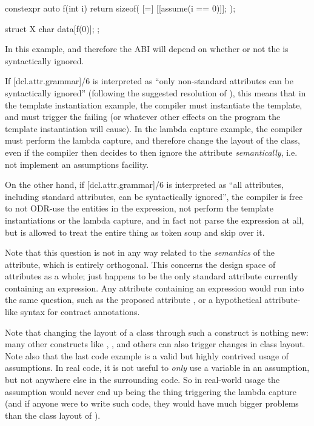\begin{codeblock}
constexpr auto f(int i) {
  return sizeof( [=] { [[assume(i == 0)]]; } );
}

struct X {
  char data[f(0)];
};
\end{codeblock}

In this example,  and therefore the ABI will depend on whether or not the  is syntactically ignored.

If [dcl.attr.grammar]/6 is interpreted as ``only non-standard attributes can be syntactically ignored'' (following the suggested resolution of \cite{CWG2538}), this means that in the template instantiation example, the compiler must instantiate the template, and must trigger the failing  (or whatever other effects on the program the template instantiation will cause). In the lambda capture example, the compiler must perform the lambda capture, and therefore change the layout of the class, even if the compiler then decides to then ignore the attribute \emph{semantically}, i.e. not implement an assumptions facility.

On the other hand, if [dcl.attr.grammar]/6 is interpreted as ``all attributes, including standard attributes, can be syntactically ignored'', the compiler is free to not ODR-use the entities in the expression, not perform the template instantiations or the lambda capture, and in fact not parse the expression at all, but is allowed to treat the entire thing as token soup and skip over it.

Note that this question is not in any way related to the \emph{semantics} of the  attribute, which is entirely orthogonal. This concerns the design space of attributes as a whole;  just happens to be the only standard attribute currently containing an expression. Any attribute containing an expression would run into the same question, such as the proposed  attribute \cite{P1144R5}, or a hypothetical attribute-like syntax for contract annotations.

Note that changing the layout of a class through such a construct is nothing new: many other constructs like , , and others can also trigger changes in class layout. Note also that the last code example is a valid but highly contrived usage of assumptions. In real code, it is not useful to \emph{only} use a variable in an assumption, but not anywhere else in the surrounding code. So in real-world usage the assumption would never end up being the thing triggering the lambda capture (and if anyone were to write such code, they would have much bigger problems than the class layout of ).

